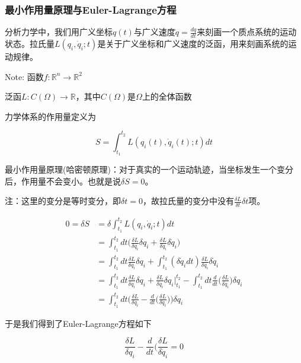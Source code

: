 \subsubsection{最小作用量原理与Euler-Lagrange方程}

分析力学中，我们用广义坐标$q(t)$与广义速度$\dot{q}=\frac{dq}{dt}$来刻画一个质点系统的运动状态。拉氏量$L(q_i,\dot{q}_i;t)$是关于广义坐标和广义速度的泛函，用来刻画系统的运动规律。

\noindent Note: 函数$f:\mathbb{R}^n\to\mathbb{R}^2$

泛函$L:C(\Omega)\to\mathbb{R}$，其中$C(\Omega)$是$\Omega$上的全体函数

力学体系的作用量定义为

\begin{equation}
    S=\int_{t_1}^{t_2}L(q_i(t),\dot{q}_i(t);t)dt
\end{equation}

最小作用量原理(哈密顿原理)：对于真实的一个运动轨迹，当坐标发生一个变分后，作用量不会变小。也就是说$\delta S=0$。

\noindent 注：这里的变分是等时变分，即$\delta t=0$，故拉氏量的变分中没有$\frac{\delta L}{\delta t}\delta t$项。

\begin{equation}
    \begin{split}
        0=\delta S &= \delta\int_{t_1}^{t_2} L(q_i,\dot{q}_i;t)dt \\
            &= \int_{t_1}^{t_2}dt \biggl(\frac{\delta L}{\delta q_i}\delta q_i+\frac{\delta L}{\delta \dot{q}_i}\delta\dot{q}_i\biggr) \\
            &= \int_{t_1}^{t_2}dt \frac{\delta L}{\delta q_i}\delta q_i + \int_{t_1}^{t_2}(\delta\dot{q}_idt)\frac{\delta L}{\delta \dot{q}_i}\delta\dot{q}_i \\
            &= \int_{t_1}^{t_2}dt \frac{\delta L}{\delta q_i}\delta q_i + \frac{\delta L}{\delta \dot{q}_i}\delta q_i|_{t_1}^{t_2} - \int_{t_1}^{t_2}dt \frac{d}{dt}\bigl(\frac{\delta L}{\delta \dot{q}_i}\bigr)\delta q_i \\
            &= \int_{t_1}^{t_2}dt \biggl(\frac{\delta L}{\delta q_i}-\frac{d}{dt}\bigl(\frac{\delta L}{\delta \dot{q}_i}\bigr)\biggr)\delta q_i
    \end{split}
\end{equation}

于是我们得到了Euler-Lagrange方程如下

\begin{equation}\label{Euler-Lagrange}
    \frac{\delta L}{\delta q_i}-\frac{d}{dt}\bigl(\frac{\delta L}{\delta \dot{q}_i} = 0
\end{equation}

